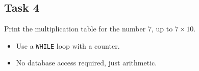 \documentclass[12pt,a4paper]{article}
\newif\ifshowsolutions
\begin{document}
\subsection*{Task 4}
Print the multiplication table for the number 7, up to $7 \times 10$.
\begin{itemize}
    \item Use a \texttt{WHILE} loop with a counter.
    \item No database access required, just arithmetic.
\end{itemize}

\ifshowsolutions
\textbf{Solution:}
\begin{lstlisting}[language=SQL]
DO $$ 
DECLARE
    v_num INT := 7;
    v_counter INT := 1;
    v_result INT;
BEGIN
    WHILE v_counter <= 10 LOOP
        v_result := v_num * v_counter;
        RAISE NOTICE '% x % = %', v_num, v_counter, v_result;
        v_counter := v_counter + 1;
    END LOOP;
END $$;
\end{lstlisting}
\fi
\end{document}

